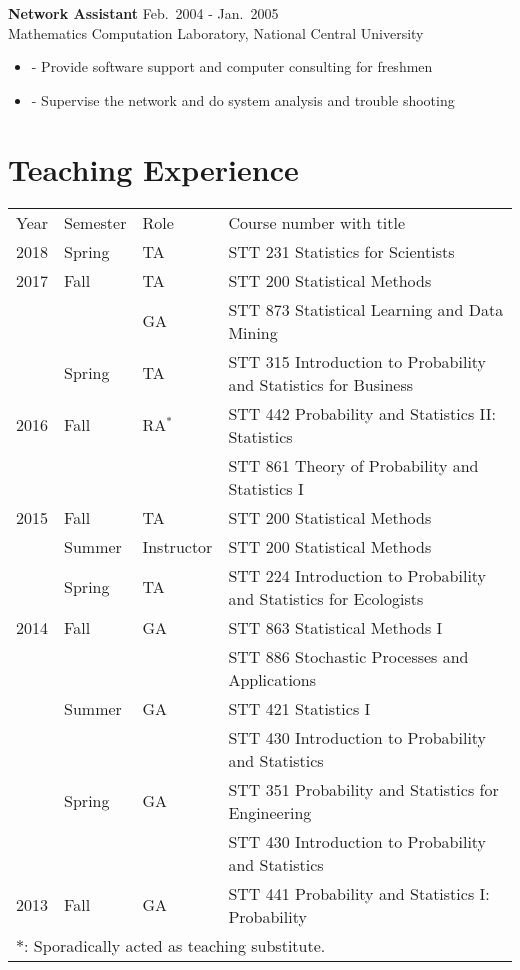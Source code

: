 \documentclass[a4paper,10pt,dvipdfmx]{article}
\begin{document}
\indent \textbf{Network Assistant} \hfill Feb.~2004 - Jan.~2005\\
\indent Mathematics Computation Laboratory, National Central University
\begin{itemize}[noitemsep,nolistsep]
  \item[] - Provide software support and computer consulting for freshmen
  \item[] - Supervise the network and do system analysis and trouble shooting
\end{itemize}

\section*{Teaching Experience}
\begin{small}
  \begin{tabular}{llll}
    Year  & Semester& Role       & Course number with title\\
    2018  & Spring  & TA         & STT 231 Statistics for Scientists\\
    2017  & Fall	  & TA				 & STT 200 Statistical Methods\\
          &			    & GA				 & STT 873 Statistical Learning and Data Mining\\
          & Spring  & TA				 & STT 315 Introduction to Probability and Statistics for Business\\
    2016  & Fall    & RA$^{*}$   & STT 442 Probability and Statistics II: Statistics\\
          &         &            & STT 861 Theory of Probability and Statistics I\\
    2015  & Fall	  & TA				 & STT 200 Statistical Methods\\
          & Summer  & Instructor & STT 200 Statistical Methods\\
          & Spring  & TA				 & STT 224 Introduction to Probability and Statistics for Ecologists\\
    2014  & Fall	  & GA				 & STT 863 Statistical Methods I\\
          &			    &						 & STT 886 Stochastic Processes and Applications\\
          & Summer  & GA				 & STT 421 Statistics I\\
          &			    &						 & STT 430 Introduction to Probability and Statistics\\
          & Spring  & GA				 & STT 351 Probability and Statistics for Engineering\\
          &			    &						 & STT 430 Introduction to Probability and Statistics\\
    2013  & Fall	  & GA				 & STT 441 Probability and Statistics I: Probability\\
    \multicolumn{4}{l}{$*$: Sporadically acted as teaching substitute.}
  \end{tabular}
\end{small}
\end{document}
